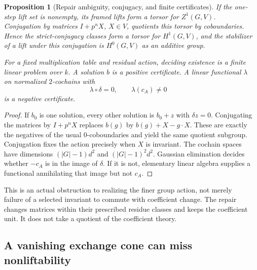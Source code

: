\documentclass[11pt]{article}
\newtheorem{proposition}[theorem]{Proposition}
\theoremstyle{definition}
\theoremstyle{remark}
\begin{document}
\begin{proposition}[Repair ambiguity, conjugacy, and finite certificates]\label{prop:repair-H1}
If the one-step lift set is nonempty, its framed lifts form a torsor for $Z^1(G,V)$. Conjugation by matrices $I+p^nX$, $X\in V$, quotients this torsor by coboundaries. Hence the strict-conjugacy classes form a torsor for $H^1(G,V)$, and the stabilizer of a lift under this conjugation is $H^0(G,V)$ as an additive group.

For a fixed multiplication table and residual action, deciding existence is a finite linear problem over $k$. A solution $b$ is a positive certificate. A linear functional $\lambda$ on normalized $2$-cochains with
\[
 \lambda\circ\delta=0,\qquad \lambda(c_A)\ne0
\]
is a negative certificate.
\end{proposition}
\begin{proof}
If $b_0$ is one solution, every other solution is $b_0+z$ with $\delta z=0$. Conjugating the matrices by $I+p^nX$ replaces $b(g)$ by $b(g)+X-g\cdot X$. These are exactly the negatives of the usual $0$-coboundaries and yield the same quotient subgroup. Conjugation fixes the action precisely when $X$ is invariant. The cochain spaces have dimensions $(|G|-1)d^2$ and $(|G|-1)^2d^2$. Gaussian elimination decides whether $-c_A$ is in the image of $\delta$. If it is not, elementary linear algebra supplies a functional annihilating that image but not $c_A$.
\end{proof}

This is an actual obstruction to realizing the finer group action, not merely failure of a selected invariant to commute with coefficient change. The repair changes matrices within their prescribed residue classes and keeps the coefficient unit. It does not take a quotient of the coefficient theory.

\subsection{A vanishing exchange cone can miss nonliftability}
\end{document}
